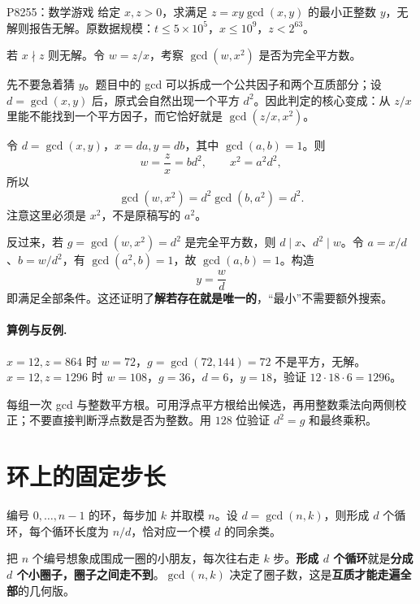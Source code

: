 \begin{problem}{P8255：数学游戏}
给定 $x,z>0$，求满足 $z=xy\gcd(x,y)$ 的最小正整数 $y$，无解则报告无解。原数据规模：$t\le5\times10^5$，$x\le10^9$，$z<2^{63}$。
\end{problem}
\hint 若 $x\nmid z$ 则无解。令 $w=z/x$，考察 $\gcd(w,x^2)$ 是否为完全平方数。

\begin{pitfall}[讲解：先看这题到底在做什么]
先不要急着猜 $y$。题目中的 gcd 可以拆成一个公共因子和两个互质部分；设 $d=\gcd(x,y)$ 后，原式会自然出现一个平方 $d^2$。因此判定的核心变成：从 $z/x$ 里能不能找到一个平方因子，而它恰好就是 $\gcd(z/x,x^2)$。
\end{pitfall}

\sol 令 $d=\gcd(x,y)$，$x=da,y=db$，其中 $\gcd(a,b)=1$。则
\[
 w=\frac zx=bd^2,\qquad x^2=a^2d^2,
\]
所以
\[
 \gcd(w,x^2)=d^2\gcd(b,a^2)=d^2.
\]
注意这里必须是 $x^2$，不是原稿写的 $a^2$。

反过来，若 $g=\gcd(w,x^2)=d^2$ 是完全平方数，则 $d\mid x$、$d^2\mid w$。令 $a=x/d$、$b=w/d^2$，有 $\gcd(a^2,b)=1$，故 $\gcd(a,b)=1$。构造
\[
 y=\frac wd
\]
即满足全部条件。这还证明了\textbf{解若存在就是唯一的}，“最小”不需要额外搜索。

\paragraph{算例与反例.} $x=12,z=864$ 时 $w=72$，$g=\gcd(72,144)=72$ 不是平方，无解。
$x=12,z=1296$ 时 $w=108$，$g=36$，$d=6$，$y=18$，验证 $12\cdot18\cdot6=1296$。

\cost 每组一次 gcd 与整数平方根。可用浮点平方根给出候选，再用整数乘法向两侧校正；不要直接判断浮点数是否为整数。用 $128$ 位验证 $d^2=g$ 和最终乘积。


\section{环上的固定步长}
\begin{theorem}
编号 $0,\ldots,n-1$ 的环，每步加 $k$ 并取模 $n$。设 $d=\gcd(n,k)$，则形成 $d$ 个循环，每个循环长度为 $n/d$，恰对应一个模 $d$ 的同余类。
\end{theorem}

\begin{tip}[图景：围成一圈走 $k$ 步]
把 $n$ 个编号想象成围成一圈的小朋友，每次往右走 $k$ 步。\textbf{形成 $d$ 个循环}就是\textbf{分成 $d$ 个小圈子，圈子之间走不到}。$\gcd(n,k)$ 决定了圈子数，这是\textbf{互质才能走遍全部}的几何版。
\end{tip}

